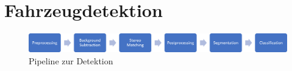 \chapter{Fahrzeugdetektion}

\begin{figure}
 \centering
 \includegraphics[width=1.1\textwidth]{media/pipeline.png}
 \caption{Pipeline zur Detektion}
 \label{fig:boxfilter}
\end{figure}
